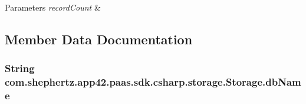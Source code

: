 \begin{DoxyParams}{Parameters}
{\em record\+Count} & \\
\hline
\end{DoxyParams}


\subsection{Member Data Documentation}
\hypertarget{classcom_1_1shephertz_1_1app42_1_1paas_1_1sdk_1_1csharp_1_1storage_1_1_storage_a55a3b941e53c1a16eac1735e174edd49}{
\subsubsection[{db\+Name}]{\setlength{\rightskip}{0pt plus 5cm}String com.\+shephertz.\+app42.\+paas.\+sdk.\+csharp.\+storage.\+Storage.\+db\+Name}}\label{classcom_1_1shephertz_1_1app42_1_1paas_1_1sdk_1_1csharp_1_1storage_1_1_storage_a55a3b941e53c1a16eac1735e174edd49}




